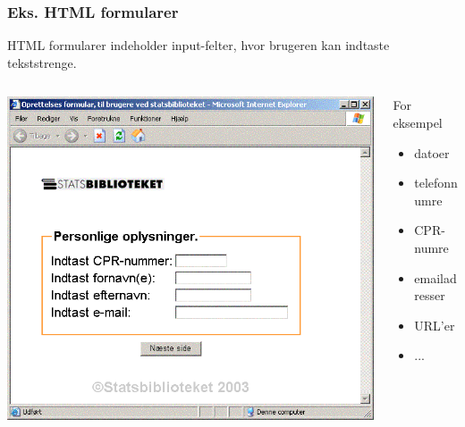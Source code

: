 \documentclass[]{beamer}
\begin{document}
\begin{frame}
  \frametitle{Eks. HTML formularer}
  HTML formularer indeholder input-felter, hvor
  brugeren kan indtaste tekststrenge.

  \begin{columns}
    \begin{column}{0.5\textwidth}
      \includegraphics[width=\textwidth]{images/biblio}
    \end{column}

    \begin{column}{0.5\textwidth}
      For eksempel
      \begin{itemize}
      \item datoer
      \item telefonnumre
      \item CPR-numre
      \item emailadresser
      \item URL’er
      \item ...
      \end{itemize}
    \end{column}
\end{columns}

\end{frame}
\end{document}
